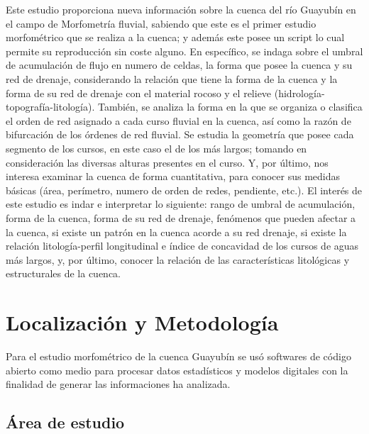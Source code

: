 \documentclass[11pt,]{article}
\begin{document}
Este estudio proporciona nueva información sobre la cuenca del río
Guayubín en el campo de Morfometría fluvial, sabiendo que este es el
primer estudio morfométrico que se realiza a la cuenca; y además este
posee un script lo cual permite su reproducción sin coste alguno. En
específico, se indaga sobre el umbral de acumulación de flujo en numero
de celdas, la forma que posee la cuenca y su red de drenaje,
considerando la relación que tiene la forma de la cuenca y la forma de
su red de drenaje con el material rocoso y el relieve
(hidrología-topografía-litología). También, se analiza la forma en la
que se organiza o clasifica el orden de red asignado a cada curso
fluvial en la cuenca, así como la razón de bifurcación de los órdenes de
red fluvial. Se estudia la geometría que posee cada segmento de los
cursos, en este caso el de los más largos; tomando en consideración las
diversas alturas presentes en el curso. Y, por último, nos interesa
examinar la cuenca de forma cuantitativa, para conocer sus medidas
básicas (área, perímetro, numero de orden de redes, pendiente, etc.). El
interés de este estudio es indar e interpretar lo siguiente: rango de
umbral de acumulación, forma de la cuenca, forma de su red de drenaje,
fenómenos que pueden afectar a la cuenca, si existe un patrón en la
cuenca acorde a su red drenaje, si existe la relación litología-perfil
longitudinal e índice de concavidad de los cursos de aguas más largos,
y, por último, conocer la relación de las características litológicas y
estructurales de la cuenca.

\section{Localización y
Metodología}\label{localizaciuxf3n-y-metodologuxeda}

Para el estudio morfométrico de la cuenca Guayubín se usó softwares de
código abierto como medio para procesar datos estadísticos y modelos
digitales con la finalidad de generar las informaciones ha analizada.

\subsection{Área de estudio}\label{uxe1rea-de-estudio}
\end{document}
